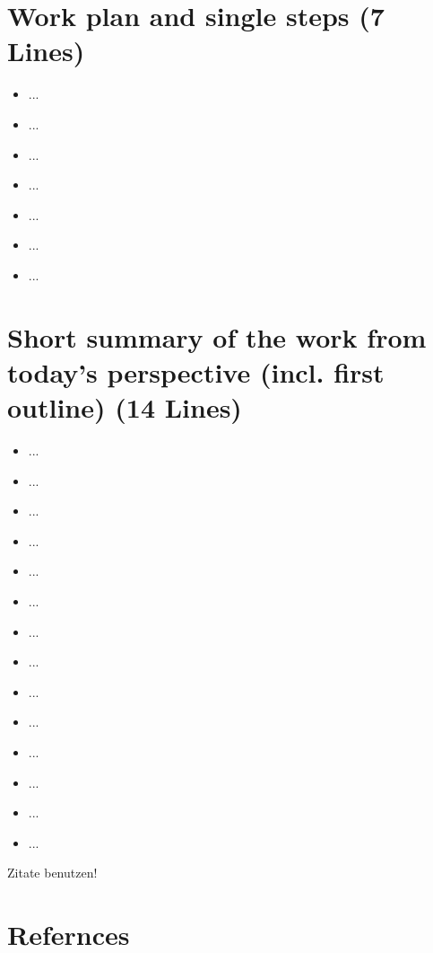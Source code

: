 \documentclass[12pt]{scrartcl}
\begin{document}
\section*{Work plan and single steps (7 Lines)}
\begin{itemize}
    \item ...
    \item ...
    \item ...
    \item ...
    \item ...
    \item ...
    \item ...
 
\end{itemize}

\section*{Short summary of the work from today’s perspective (incl. first outline) (14 Lines)}
\begin{itemize}
    \item ...
    \item ...
    \item ...
    \item ...
    \item ...
    \item ...
    \item ...
    \item ...
    \item ...
    \item ...
    \item ...
    \item ...
    \item ...
    \item ...
 
\end{itemize}




Zitate benutzen! \cite{microBpm}
\section*{Refernces}
\printbibliography[heading=none]
\end{document}
